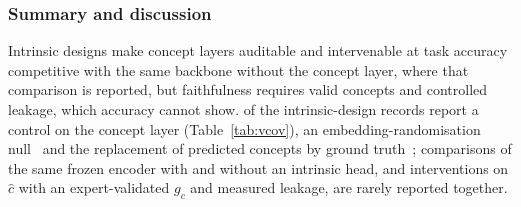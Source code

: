 \subsubsection{Summary and discussion}

Intrinsic designs make concept layers auditable and intervenable at task accuracy competitive with the same
backbone without the concept layer, where that comparison is reported, but
faithfulness requires valid concepts and controlled leakage, which accuracy cannot show. \Vintrany{} of the
\Vintrn{} intrinsic-design records report a control on the concept layer (Table~\ref{tab:vcov}), an embedding-randomisation
null~\cite{zhang2026regionfm} and the replacement of predicted concepts by ground
truth~\cite{patricio2025twostep}; comparisons of the same frozen encoder with and without an intrinsic
head, and interventions on $\hat c$ with an expert-validated $g_c$ and measured leakage, are rarely
reported together.

